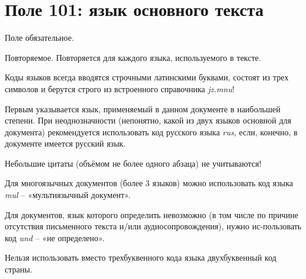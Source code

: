 \chapter*{Поле 101: язык основного текста}

Поле обязательное.

Повторяемое. Повторяется для каждого языка, используемого в тексте.

Коды языков всегда вводятся строчными латинскими буквами, состоят из трех символов и берутся строго из встроенного справочника \textit{jz.mnu}!

Первым указывается язык, применяемый в данном документе в наибольшей степени. При неоднозначности (непонятно, какой из двух языков основной для документа) рекомендуется использовать код русского языка \textit{rus}, если, конечно, в документе имеется русский язык.

Небольшие цитаты (объёмом не более одного абзаца) не учитываются!

Для многоязычных документов (более 3 языков) можно использовать код языка \textit{mul} – «мультиязычный документ».

Для документов, язык которого определить невозможно (в том числе по причине отсутствия письменного текста и/или аудиосопровождения), нужно ис-пользовать код \textit{und} – «не определено».

Нельзя использовать вместо трехбуквенного кода языка двухбуквенный код страны.

